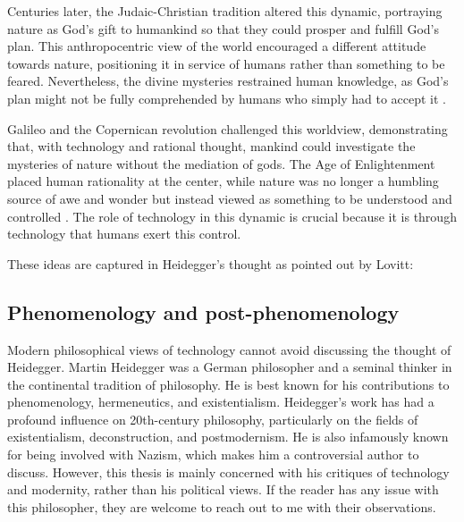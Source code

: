 Centuries later, the Judaic-Christian tradition altered this dynamic, portraying nature as God's gift to humankind so that they could prosper and fulfill God's plan\citep{Galimberti1989}. This anthropocentric view of the world encouraged a different attitude towards nature, positioning it in service of humans rather than something to be feared. Nevertheless, the divine mysteries restrained human knowledge, as God's plan might not be fully comprehended by humans who simply had to accept it \citep{Galimberti1989}.

Galileo and the Copernican revolution challenged this worldview, demonstrating that, with technology and rational thought, mankind could investigate the mysteries of nature without the mediation of gods. The Age of Enlightenment placed human rationality at the center, while nature was no longer a humbling source of awe and wonder but instead viewed as something to be understood and controlled \citep{Ihde1990, Galimberti1989}. The role of technology in this dynamic is crucial because it is through technology that humans exert this control.

These ideas are captured in Heidegger's thought as pointed out by Lovitt: 

\subsection{Phenomenology and post-phenomenology}

Modern philosophical views of technology cannot avoid discussing the thought of Heidegger. 
Martin Heidegger was a German philosopher and a seminal thinker in the continental tradition of philosophy. He is best known for his contributions to phenomenology, hermeneutics, and existentialism. Heidegger's work has had a profound influence on 20th-century philosophy, particularly on the fields of existentialism, deconstruction, and postmodernism. He is also infamously known for being involved with Nazism, which makes him a controversial author to discuss. However, this thesis is mainly concerned with his critiques of technology and modernity, rather than his political views. If the reader has any issue with this philosopher, they are welcome to reach out to me with their observations.

